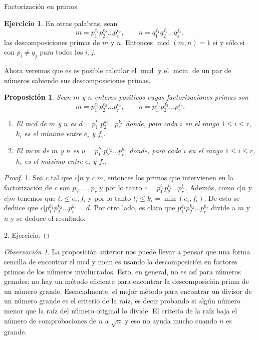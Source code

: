 \documentclass[11pt,spanish,makeidx]{amsbook}
\newtheorem{proposicion}[teorema]{Proposici\'on}
\theoremstyle{definition}
\newtheorem{ejercicio}{Ejercicio}[section]
\theoremstyle{remark}
\newtheorem{observacion}{Observaci\'on}[section]
\newcommand \mcd{\operatorname{mcd}}
\newcommand \mcm{\operatorname{mcm}}
\begin{document}
\begin{section}{Factorización en primos}
\begin{ejercicio}
En otras palabras, sean  
$$
m=p_1^{e_1}p_2^{e_2}\ldots p_r^{e_r},\qquad
n=q_1^{f_1}q_2^{f_2}\ldots q_s^{f_s},
$$ 
las descomposiciones primas de $m$ y $n$. Entonces  $\mcd(m,n) =1$ si y sólo si con $p_i \not= q_j$ para todos los $i,j$.  
\end{ejercicio}

Ahora veremos que es es posible calcular el $\mcd$ y el $\mcm$ de un par de números sabiendo sus descomposiciones primas.

\begin{proposicion}\label{prop-mcd}
Sean $m$ y $n$ enteros positivos cuyas factorizaciones primas son
$$
m=p_1^{e_1}p_2^{e_2}\ldots p_r^{e_r},\qquad
n=p_1^{f_1}p_2^{f_2}\ldots p_r^{f_r}.
$$
\begin{enumerate}
\item El mcd de $m$ y $n$ es $d=p_1^{k_1}p_2^{k_2}\ldots p_r^{k_r}$ donde, para cada $i$ en el rango $1\le i \le r$, $k_i$ es el mínimo entre $e_i$ y $f_i$.
\item El mcm de $m$ y $n$ es $u=p_1^{h_1}p_2^{h_2}\ldots p_r^{h_r}$ donde, para cada $i$ en el rango $1\le i \le r$, $h_i$ es el máximo entre $e_i$ y $f_i$.
\end{enumerate}
\end{proposicion}
\begin{proof} 1. Sea $c$ tal que $c|n$ y $c|m$, entonces los primos que intervienen en la factorización de $c$ son $p_1,\ldots,p_r$ y por lo tanto $c =  p_1^{t_1}p_2^{t_2}\ldots p_r^{t_r}$. Además, como $c|n$ y $c|m$ tenemos que $t_i \le e_i,f_i$ y por lo tanto $t_i \le k_i = \min(e_i,f_i)$. De esto se deduce que $c|p_1^{k_1}p_2^{k_2}\ldots p_r^{k_r}=d$. Por otro lado, es claro  que  $p_1^{k_1}p_2^{k_2}\ldots p_r^{k_r}$ divide a $m$ y $n$ y se deduce el resultado.

2. Ejercicio. 
\end{proof}

\begin{observacion} La proposición anterior nos puede llevar a pensar que una forma sencilla de encontrar el mcd y mcm  es usando la descomposición en factores primos de los números involucrados. Esto, en general, no es así para números grandes: no hay un método eficiente para encontrar la descomposición prima de un número grande. Esencialmente, el mejor método para encontrar un divisor de un número grande es el criterio de la raíz, es decir probando si algún número menor que la raíz del número original lo divide. El criterio de la raíz baja el número de comprobaciones de $n$ a $\sqrt{n}$ y eso no ayuda mucho cuando $n$ es grande.


\end{observacion}
\end{section}
\end{document}
